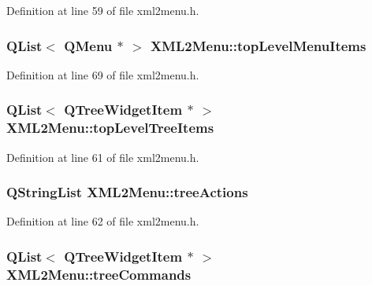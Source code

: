 Definition at line 59 of file xml2menu.h.

\hypertarget{classXML2Menu_ac5ac423657c0b6f87d8b66ac67d49eaa}{
\subsubsection[{topLevelMenuItems}]{\setlength{\rightskip}{0pt plus 5cm}QList$<$ QMenu $\ast$ $>$ {\bf XML2Menu::topLevelMenuItems}}}
\label{classXML2Menu_ac5ac423657c0b6f87d8b66ac67d49eaa}


Definition at line 69 of file xml2menu.h.

\hypertarget{classXML2Menu_a546c44f9da1506ff7d3f5f4903702550}{
\subsubsection[{topLevelTreeItems}]{\setlength{\rightskip}{0pt plus 5cm}QList$<$ QTreeWidgetItem $\ast$ $>$ {\bf XML2Menu::topLevelTreeItems}}}
\label{classXML2Menu_a546c44f9da1506ff7d3f5f4903702550}


Definition at line 61 of file xml2menu.h.

\hypertarget{classXML2Menu_aabba060620e79a1008c49d6da80d9d8c}{
\subsubsection[{treeActions}]{\setlength{\rightskip}{0pt plus 5cm}QStringList {\bf XML2Menu::treeActions}}}
\label{classXML2Menu_aabba060620e79a1008c49d6da80d9d8c}


Definition at line 62 of file xml2menu.h.

\hypertarget{classXML2Menu_ab2decbff5105065ab9f97bcc733350da}{
\subsubsection[{treeCommands}]{\setlength{\rightskip}{0pt plus 5cm}QList$<$ QTreeWidgetItem $\ast$ $>$ {\bf XML2Menu::treeCommands}}}
\label{classXML2Menu_ab2decbff5105065ab9f97bcc733350da}


